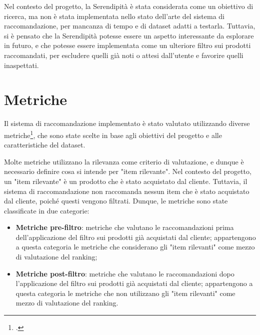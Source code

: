 Nel contesto del progetto, la Serendipità è stata considerata come un obiettivo di ricerca, ma non è stata implementata nello stato dell'arte del sistema di raccomandazione, per mancanza di tempo e di dataset adatti a testarla. Tuttavia, si è pensato che la Serendipità potesse essere un aspetto interessante da esplorare in futuro, e che potesse essere implementata come un ulteriore filtro sui prodotti raccomandati, per escludere quelli già noti o attesi dall'utente e favorire quelli inaspettati.


\section{Metriche}
\label{sec:metrics}

Il sistema di raccomandazione implementato è stato valutato utilizzando diverse metriche\footcite{site:metrics-recommender-systems}, che sono state scelte in base agli obiettivi del progetto e alle caratteristiche del dataset.

Molte metriche utilizzano la rilevanza come criterio di valutazione, e dunque è necessario definire cosa si intende per "item rilevante". Nel contesto del progetto, un "item rilevante" è un prodotto che è stato acquistato dal cliente. Tuttavia, il sistema di raccomandazione non raccomanda nessun item che è stato acquistato dal cliente, poiché questi vengono filtrati. Dunque, le metriche sono state classificate in due categorie:
\begin{itemize}
    \item \textbf{Metriche pre-filtro}: metriche che valutano le raccomandazioni prima dell'applicazione del filtro sui prodotti già acquistati dal cliente; appartengono a questa categoria le metriche che considerano gli "item rilevanti" come mezzo di valutazione del ranking;
    \item \textbf{Metriche post-filtro}: metriche che valutano le raccomandazioni dopo l'applicazione del filtro sui prodotti già acquistati dal cliente; appartengono a questa categoria le metriche che non utilizzano gli "item rilevanti" come mezzo di valutazione del ranking.
\end{itemize}

